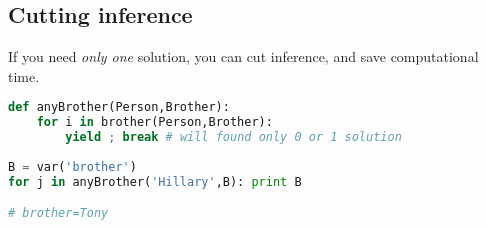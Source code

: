 \subsection{Cutting inference}

If you need \emph{only one} solution, you can cut inference, and save
computational time.

\begin{lstlisting}[language=Python]
def anyBrother(Person,Brother):
	for i in brother(Person,Brother):
		yield ; break # will found only 0 or 1 solution
	
B = var('brother')
for j in anyBrother('Hillary',B): print B

# brother=Tony
\end{lstlisting}
